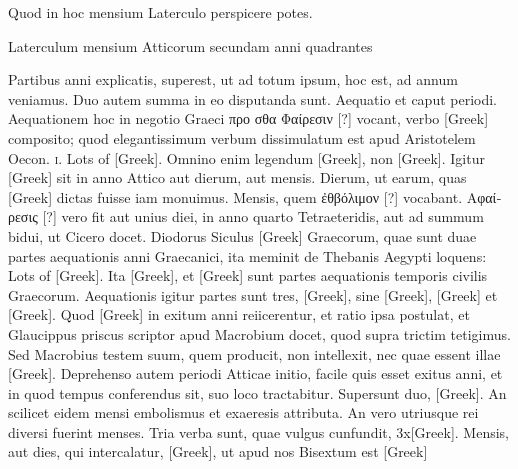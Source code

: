 Quod in hoc mensium
Laterculo perspicere potes.

\begin{table}[htbp]
\centering

\caption{Laterculum mensium Atticorum secundam anni quadrantes}
\label{tab:mensium_atticorum}
\end{table}

Partibus anni explicatis, superest, ut ad
totum ipsum, hoc est, ad annum veniamus.
Duo autem summa in eo disputanda
sunt.
Aequatio et caput periodi.
Aequationem
hoc in negotio Graeci \textgreek{προ σθα Φαίρεσιν [?]}
vocant, verbo \textgreek{[Greek]}
composito; quod elegantissimum verbum
dissimulatum est apud Aristotelem Oecon.
\textsc{i}. \textgreek{Lots of [Greek]}.
Omnino enim legendum
\textgreek{[Greek]}, non \textgreek{[Greek]}.
Igitur
\textgreek{[Greek]} sit in anno Attico aut dierum, aut
mensis.
Dierum, ut earum, quas \textgreek{[Greek]}
dictas fuisse iam monuimus.
Mensis, quem \textgreek{ἐθβόλιμον [?]} vocabant.
\textgreek{Αφαίρεσις [?]} vero fit aut unius diei, in anno
quarto Tetraeteridis, aut ad summum bidui,
ut Cicero docet.
Diodorus Siculus \textgreek{[Greek]}
Graecorum, quae
sunt duae partes aequationis anni Graecanici,
ita meminit de Thebanis Aegypti loquens:
\textgreek{Lots of [Greek]}.
Ita \textgreek{[Greek]}, et
\textgreek{[Greek]} sunt partes aequationis temporis civilis Graecorum.
Aequationis igitur partes sunt tres, \textgreek{[Greek]},
 sine \textgreek{[Greek]},
\textgreek{[Greek]} et \textgreek{[Greek]}.
Quod \textgreek{[Greek]} in exitum anni reiicerentur,
et ratio ipsa postulat, et Glaucippus priscus scriptor apud
Macrobium docet, quod supra trictim tetigimus.
Sed Macrobius testem
suum, quem producit, non intellexit, nec quae essent illae \textgreek{[Greek]}.
Deprehenso autem periodi Atticae
initio, facile quis esset exitus anni, et in quod tempus conferendus
sit, suo loco tractabitur.
Supersunt duo, \textgreek{[Greek]}.
An scilicet eidem mensi embolismus et exaeresis attributa.
An
vero utriusque rei diversi fuerint menses.
Tria verba sunt, quae vulgus
cunfundit, \textgreek{3x[Greek]}.
Mensis, aut
dies, qui intercalatur, \textgreek{[Greek]}, ut apud nos Bisextum est
 \textgreek{[Greek]}

